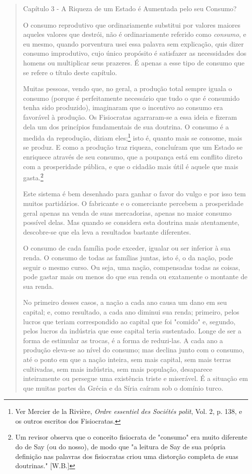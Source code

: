 \documentclass[12pt]{article}
\begin{document}
\begin{quote}
Capítulo 3 - A Riqueza de um Estado é Aumentada pelo seu Consumo?

O consumo reprodutivo que ordinariamente substitui por valores maiores aqueles valores que destrói, não é ordinariamente referido como \textit{consumo}, e eu mesmo, quando porventura usei essa palavra sem explicação, quis dizer consumo improdutivo, cujo único propósito é satisfazer as necessidades dos homens ou multiplicar seus prazeres. É apenas a esse tipo de consumo que se refere o título deste capítulo.

Muitas pessoas, vendo que, no geral, a produção total sempre iguala o consumo (porque é perfeitamente necessário que tudo o que é consumido tenha sido produzido), imaginaram que o incentivo ao consumo era favorável à produção. Os Fisiocratas agarraram-se a essa ideia e fizeram dela um dos princípios fundamentais de sua doutrina. O consumo é a medida da reprodução, diziam eles;\footnote{Ver Mercier de la Rivière, \textit{Ordre essentiel des Sociétés polit}, Vol. 2, p. 138, e os outros escritos dos Fisiocratas.} isto é, quanto mais se consome, mais se produz. E como a produção traz riqueza, concluíram que um Estado se enriquece através de seu consumo, que a poupança está em conflito direto com a prosperidade pública, e que o cidadão mais útil é aquele que mais gasta.\footnote{Um revisor observa que o conceito fisiocrata de "consumo" era muito diferente do de Say (ou do nosso), de modo que "a leitura de Say de sua própria definição nas palavras dos fisiocratas criou uma distorção completa de suas doutrinas." [W.B.]}

Este sistema é bem desenhado para ganhar o favor do vulgo e por isso tem muitos partidários. O fabricante e o comerciante percebem a prosperidade geral apenas na venda de suas mercadorias, apenas no maior consumo possível delas. Mas quando se considera esta doutrina mais atentamente, descobre-se que ela leva a resultados bastante diferentes.

O consumo de cada família pode exceder, igualar ou ser inferior à sua renda. O consumo de todas as famílias juntas, isto é, o da nação, pode seguir o mesmo curso. Ou seja, uma nação, compensadas todas as coisas, pode gastar mais ou menos do que sua renda ou exatamente o montante de sua renda.

No primeiro desses casos, a nação a cada ano causa um dano em seu capital; e, como resultado, a cada ano diminui sua renda; primeiro, pelos lucros que teriam correspondido ao capital que foi "comido" e, segundo, pelos lucros da indústria que esse capital teria sustentado. Longe de ser a forma de estimular as trocas, é a forma de reduzi-las. A cada ano a produção eleva-se ao nível do consumo; mas declina junto com o consumo, até o ponto em que a nação inteira, sem mais capital, sem mais terras cultivadas, sem mais indústria, sem mais população, desaparece inteiramente ou persegue uma existência triste e miserável. É a situação em que muitas partes da Grécia e da Síria caíram sob o domínio turco.


\end{quote}
\end{document}
